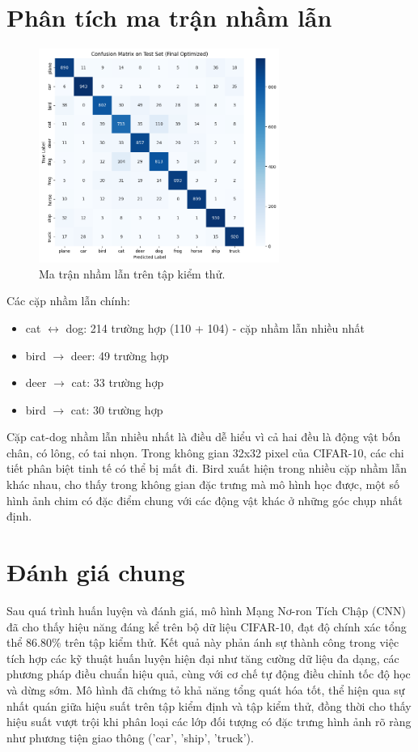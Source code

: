 \documentclass[12pt, a4paper, openany]{report}
\begin{document}
\section{Phân tích ma trận nhầm lẫn}
\begin{figure}[H]
    \centering
    \includegraphics[width=0.7\textwidth]{confusion_matrix.png}
    \caption{Ma trận nhầm lẫn trên tập kiểm thử.}
    \label{fig:confusion_matrix}
\end{figure}
Các cặp nhầm lẫn chính:
\begin{itemize}
    \item cat $\leftrightarrow$ dog: 214 trường hợp (110 + 104) - cặp nhầm lẫn nhiều nhất
    \item bird $\rightarrow$ deer: 49 trường hợp
    \item deer $\rightarrow$ cat: 33 trường hợp
    \item bird $\rightarrow$ cat: 30 trường hợp
\end{itemize}

Cặp cat-dog nhầm lẫn nhiều nhất là điều dễ hiểu vì cả hai đều là động vật bốn chân, có lông, có tai nhọn. Trong không gian 32x32 pixel của CIFAR-10, các chi tiết phân biệt tinh tế có thể bị mất đi. Bird xuất hiện trong nhiều cặp nhầm lẫn khác nhau, cho thấy trong không gian đặc trưng mà mô hình học được, một số hình ảnh chim có đặc điểm chung với các động vật khác ở những góc chụp nhất định.

\section{Đánh giá chung}
Sau quá trình huấn luyện và đánh giá, mô hình Mạng Nơ-ron Tích Chập (CNN) đã cho thấy hiệu năng đáng kể trên bộ dữ liệu CIFAR-10, đạt độ chính xác tổng thể 86.80\% trên tập kiểm thử. Kết quả này phản ánh sự thành công trong việc tích hợp các kỹ thuật huấn luyện hiện đại như tăng cường dữ liệu đa dạng, các phương pháp điều chuẩn hiệu quả, cùng với cơ chế tự động điều chỉnh tốc độ học và dừng sớm. Mô hình đã chứng tỏ khả năng tổng quát hóa tốt, thể hiện qua sự nhất quán giữa hiệu suất trên tập kiểm định và tập kiểm thử, đồng thời cho thấy hiệu suất vượt trội khi phân loại các lớp đối tượng có đặc trưng hình ảnh rõ ràng như phương tiện giao thông ('car', 'ship', 'truck').
\end{document}
